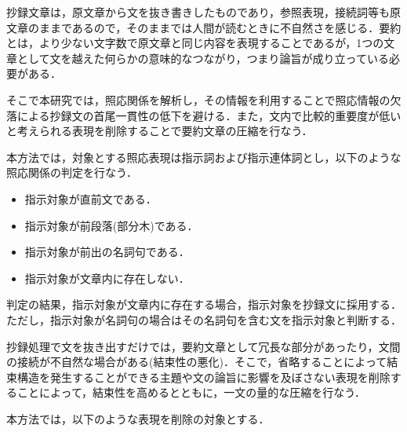 \vspace{5mm}

抄録文章は，原文章から文を抜き書きしたものであり，参照表現，接続詞等も原
文章のままであるので，そのままでは人間が読むときに不自然さを感じる．要約
とは，より少ない文字数で原文章と同じ内容を表現することであるが，1つの文
章として文を越えた何らかの意味的なつながり，つまり論旨が成り立っている必
要がある．

そこで本研究では，照応関係を解析し，その情報を利用することで照応情報の欠
落による抄録文の首尾一貫性の低下を避ける．また，文内で比較的重要度が低い
と考えられる表現を削除することで要約文章の圧縮を行なう．

本方法では，対象とする照応表現は指示詞および指示連体詞とし，以下のような
照応関係の判定を行なう．

\begin{itemize}
 \item 指示対象が直前文である．
 \item 指示対象が前段落(部分木)である．
 \item 指示対象が前出の名詞句である．
 \item 指示対象が文章内に存在しない．
\end{itemize}					  

判定の結果，指示対象が文章内に存在する場合，指示対象を抄録文に採用する．
ただし，指示対象が名詞句の場合はその名詞句を含む文を指示対象と判断する．

抄録処理で文を抜き出すだけでは，要約文章として冗長な部分があったり，文間
の接続が不自然な場合がある(結束性の悪化)．そこで，省略することによって結 
束構造を発生することができる主題や文の論旨に影響を及ぼさない表現を削除す 
ることによって，結束性を高めるとともに，一文の量的な圧縮を行なう．

本方法では，以下のような表現を削除の対象とする．

